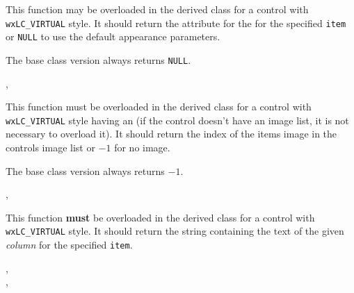 
This function may be overloaded in the derived class for a control with
{\tt wxLC\_VIRTUAL} style. It should return the attribute for the
for the specified {\tt item} or {\tt NULL} to use the default appearance
parameters.

The base class version always returns {\tt NULL}.


,\\


\label{wxlistctrlongetitemimage}


This function must be overloaded in the derived class for a control with
{\tt wxLC\_VIRTUAL} style having an 
(if the control doesn't have an image list, it is not necessary to overload
 it). It should return the index of the items image in the controls image list
or $-1$ for no image.

The base class version always returns $-1$.


,\\


\label{wxlistctrlongetitemtext}


This function {\bf must} be overloaded in the derived class for a control with
{\tt wxLC\_VIRTUAL} style. It should return the string containing the text of
the given {\it column} for the specified {\tt item}.


,\\
,\\


\label{wxlistctrlrefreshitem}


